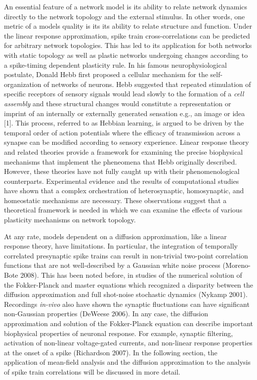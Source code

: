\documentclass{ucetd}
\begin{document}
An essential feature of a network model is its ability to relate network dynamics directly to the network topology and the external stimulus. In other words, one metric of a models quality is its its ability to relate structure and function. Under the linear response approximation, spike train cross-correlations can be predicted for arbitrary network topologies. This has led to its application for both networks with static topology as well as plastic networks undergoing changes according to a spike-timing dependent plasticity rule. In his famous neurophysiological postulate, Donald Hebb first proposed a cellular mechanism for the self-organization of networks of neurons. Hebb suggested that repeated stimulation of specific receptors of sensory signals would lead slowly to the formation of a \emph{cell assembly} and these structural changes would constitute a representation or imprint of an internally or externally generated sensation e.g., an image or idea [1]. This process, referred to as Hebbian learning, is argued to be driven by the temporal order of action potentials where the efficacy of transmission across a synapse can be modified according to sensory experience. Linear response theory and related theories provide a framework for examining the precise biophysical mechanisms that implement the pheneomena that Hebb originally described. However, these theories have not fully caught up with their phenomenological counterparts. Experimental evidence and the results of computational studies have shown that a complex orchestration of heterosynaptic, homosynaptic, and homeostatic mechanisms are necessary. These observations suggest that a theoretical framework is needed in which we can examine the effects of various plasticity mechanisms on network topology. 

At any rate, models dependent on a diffusion approximation, like a linear response theory, have limitations. In particular, the integration of temporally correlated presynaptic spike trains can result in non-trivial two-point correlation functions that are not well-described by a Gaussian white noise process (Moreno-Bote 2008). This has been noted before, in studies of the numerical solution of the Fokker-Planck and master equations which recognized a disparity between the diffusion approximation and full shot-noise stochastic dynamics (Nykamp 2001). Recordings \emph{in-vivo} also have shown the synaptic fluctuations can have significant non-Gaussian properties (DeWeese 2006). In any case, the diffusion approximation and solution of the Fokker-Planck equation can describe important biophysical properties of neuronal response. For example, synaptic filtering, activation of non-linear voltage-gated currents, and non-linear response properties at the onset of a spike (Richardson 2007). In the following section, the application of mean-field analysis and the diffusion approximation to the analysis of spike train correlations will be discussed in more detail.
\end{document}
